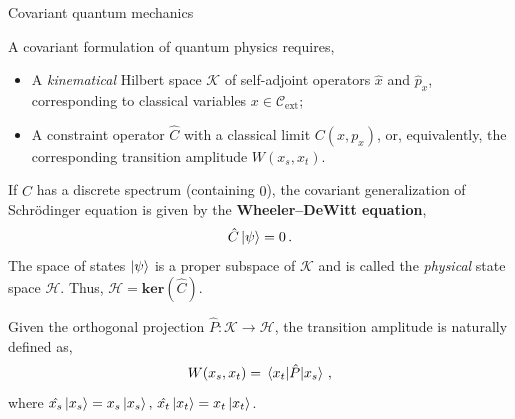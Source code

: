 \documentclass[12pt,titlepage]{article}
\begin{document}
\begin{frame}{Covariant quantum mechanics}
    \begin{list}{\,}{\leftmargin=1em \itemindent=0em}
        \item<1-> A covariant formulation of quantum physics requires,
        \begin{itemize}
            \item<1-> A \textit{kinematical} Hilbert space $\mathcal{K}$ of self-adjoint operators $\hat{x}$ and $\hat{p}_x$, corresponding to classical variables $x\in\mathcal{C}_{\text{ext}}$;
            \item<2-> A constraint operator $\hat{C}$ with a classical limit $C(x,p_x)$, or, equivalently, the corresponding transition amplitude $W(x_s,x_t)$.
        \end{itemize}
        \item<3-> If $\hat{C}$ has a discrete spectrum (containing $0$), the covariant generalization of Schr\"{o}dinger equation is given by the \textbf{Wheeler–DeWitt equation},
        \begin{equation}
            \hat{C}\ket{\psi}=0\,.
        \end{equation}
        The space of states $\ket{\psi}$ is a proper subspace of $\mathcal{K}$ and is called the \textit{physical} state space $\mathcal{H}$. Thus, $\mathcal{H}=\mathbf{ker}(\hat{C})$.
        \item<4-> Given the orthogonal projection $\hat{P}:\mathcal{K}\to\mathcal{H}$, the transition amplitude is naturally defined as,
        \begin{equation}
            W(x_s,x_t)=\mel{x_t}{\hat{P}}{x_s}\,,
        \end{equation}
        where $\hat{x_s}\ket{x_s}=x_s\ket{x_s},\,\hat{x_t}\ket{x_t}=x_t\ket{x_t}$.
    \end{list}
\end{frame}
\end{document}
